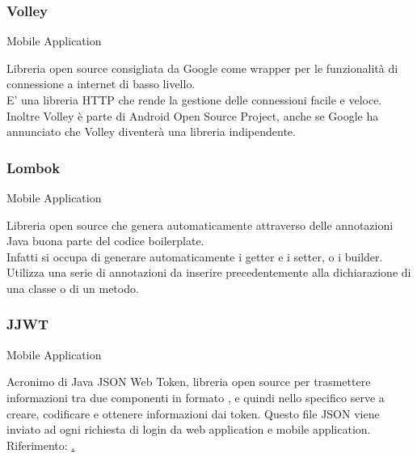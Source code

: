 \documentclass[../../../manuale-sviluppatore.tex]{subfiles}
\begin{document}
\subsubsection{Volley}%
\label{subs:volley}
Mobile Application

Libreria open source consigliata da Google come wrapper per le funzionalità di connessione a internet di basso livello.\\
E' una libreria HTTP che rende la gestione delle connessioni facile e veloce.\\
Inoltre Volley è parte di Android Open Source Project, anche se Google ha annunciato che Volley 
diventerà una libreria indipendente.

\subsubsection{Lombok}%
\label{subs:lombok}
Mobile Application

Libreria open source che genera automaticamente attraverso delle annotazioni Java buona parte del codice boilerplate.\\
Infatti si occupa di generare automaticamente i getter e i setter, o i builder.\\
Utilizza una serie di annotazioni da inserire precedentemente alla dichiarazione di una classe o di un metodo.


\subsubsection{JJWT}%
\label{subs:jjwt}
Mobile Application

Acronimo di Java JSON Web Token, libreria open source per trasmettere informazioni tra due componenti in formato , e quindi nello specifico serve a creare, codificare e ottenere informazioni dai token. Questo file JSON viene inviato ad ogni richiesta di login da web application e mobile application.
Riferimento: \href{https://github.com/jwtk/jjwt}.
\end{document}
